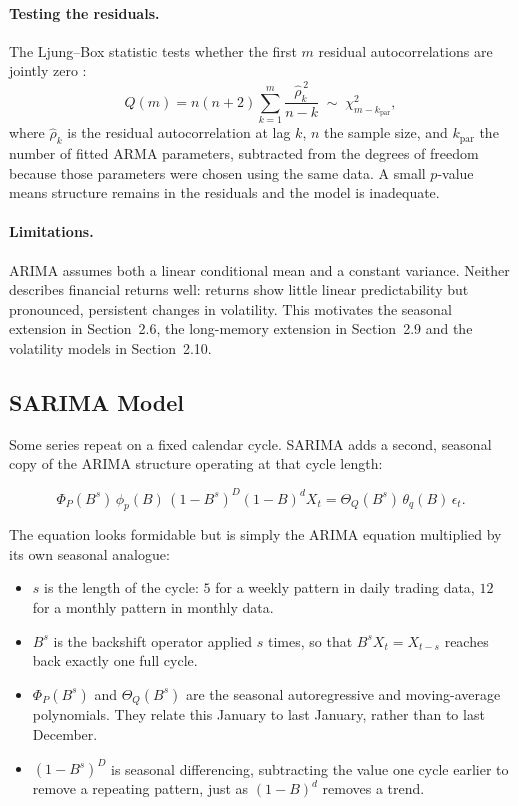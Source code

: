 \documentclass[12pt,a4paper]{article}
\begin{document}
\paragraph{Testing the residuals.} The Ljung--Box statistic tests whether the
first $m$ residual autocorrelations are jointly zero \cite{Ljung_1978}:
\begin{equation}
Q(m) = n(n+2)\sum_{k=1}^{m}\frac{\hat\rho_k^{\,2}}{n-k}
\;\sim\; \chi^2_{m-k_{\mathrm{par}}} ,
\end{equation}
where $\hat\rho_k$ is the residual autocorrelation at lag $k$, $n$ the sample
size, and $k_{\mathrm{par}}$ the number of fitted ARMA parameters, subtracted
from the degrees of freedom because those parameters were chosen using the same
data. A small $p$-value means structure remains in the residuals and the model
is inadequate.

\paragraph{Limitations.} ARIMA assumes both a linear conditional mean and a
constant variance. Neither describes financial returns well: returns show
little linear predictability but pronounced, persistent changes in volatility.
This motivates the seasonal extension in Section~2.6, the long-memory
extension in Section~2.9 and the volatility models in Section~2.10.

\subsection{SARIMA Model}

Some series repeat on a fixed calendar cycle. SARIMA adds a second, seasonal
copy of the ARIMA structure operating at that cycle length:

\begin{equation}
\Phi_P(B^{s})\,\phi_p(B)\,(1-B^{s})^{D}(1-B)^{d}X_t
= \Theta_Q(B^{s})\,\theta_q(B)\,\epsilon_t .
\end{equation}

The equation looks formidable but is simply the ARIMA equation multiplied by
its own seasonal analogue:
\begin{itemize}
\item $s$ is the length of the cycle: $5$ for a weekly pattern in daily
      trading data, $12$ for a monthly pattern in monthly data.
\item $B^{s}$ is the backshift operator applied $s$ times, so that
      $B^{s}X_t = X_{t-s}$ reaches back exactly one full cycle.
\item $\Phi_P(B^{s})$ and $\Theta_Q(B^{s})$ are the seasonal autoregressive
      and moving-average polynomials. They relate this January to last
      January, rather than to last December.
\item $(1-B^{s})^{D}$ is seasonal differencing, subtracting the value one
      cycle earlier to remove a repeating pattern, just as $(1-B)^d$ removes a
      trend.
\end{itemize}
\end{document}
